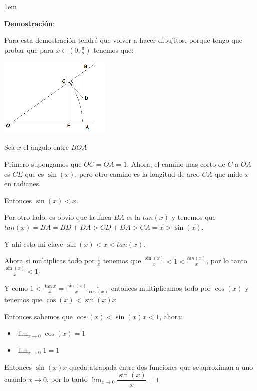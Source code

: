 \documentclass[12pt, fleqn]{report}                             %
\newenvironment{SmallIndentation}[1][0.75em]                    %
        {\begin{adjustwidth}{#1}{}\begin{footnotesize}}             %
        {\end{footnotesize}\end{adjustwidth}}                       %
\theoremstyle{break}                                            %
\newcommand{\Wrap}[1]           {\left( #1 \right)}             %
\newcommand{\Cos}[1] {\cos\Wrap{#1}}                            %
\newcommand{\Sin}[1] {\sin\Wrap{#1}}                            %
\newcommand{\Tan}[1] {tan\Wrap{#1}}                             %
\begin{document}
                \begin{SmallIndentation}[1em]
                    \textbf{Demostración}:
                    
                    Para esta demostración tendré que volver a hacer dibujitos, porque tengo que
                    probar que para $x \in (0, \frac{\pi}{2})$ tenemos que:

                    \includegraphics[width=0.40\textwidth]{LimSinx}
                    

                    Sea $x$ el angulo entre $BOA$

                    Primero supongamos que $OC = OA = 1$. Ahora, el camino mas corto de
                    $C$ a $OA$ es $CE$ que es $\Sin{x}$, pero otro camino es la longitud de
                    arco $CA$ que mide $x$ en radianes.

                    Entonces $\Sin{x} < x$.

                    Por otro lado, es obvio que la línea $BA$ es la $tan(x)$ y tenemos que
                    $\Tan{x} = BA = BD+DA > CD+DA > CA = x > \Sin{x}$.

                    Y ahí esta mi clave $\Sin{x} < x < \Tan{x}$.

                    Ahora si multiplicas todo por $\frac{1}{x}$ tenemos que 
                    $\frac{\Sin{x}}{x} < 1 < \frac{\Tan{x}}{x}$, por lo tanto 
                    $\frac{\Sin{x}}{x} < 1$.

                    Y como $1 < \frac{\tan{x}}{x} = \frac{\Sin{x}}{x} \frac{1}{\Cos{x}}$
                    entonces multiplicamos todo por $\Cos{x}$ y tenemos que $\Cos{x} < \Sin{x}{x}$

                    Entonces sabemos que $\Cos{x} < \Sin{x}{x} < 1$, ahora:
                    \begin{itemize}
                        \item $\lim_{x \to 0} \Cos{x} = 1$
                        \item $\lim_{x \to 0} 1 = 1$
                    \end{itemize}

                    Entonces $\Sin{x}{x}$ queda atrapada entre dos funciones que se aproximan a uno
                    cuando $x \to 0$, por lo tanto $\lim_{x \to 0} \dfrac{\Sin{x}}{x} = 1$
                                    
                \end{SmallIndentation}
                    
\end{document}
